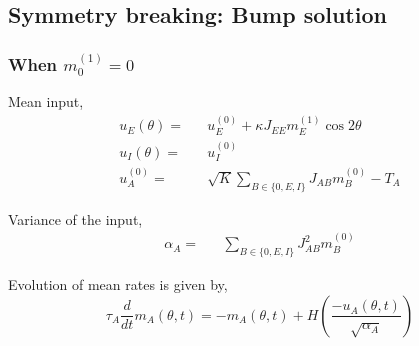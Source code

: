 \documentclass[%
 reprint,
 amsmath,amssymb,
 aps,
]{revtex4-1}
\begin{document}



\subsection{Symmetry breaking: Bump solution} 

\subsubsection{When  $m_0^{(1)} = 0$}

Mean input, \\
\begin{eqnarray}
u_E(\theta) =&& u^{(0)}_E + \kappa J_{EE} m_E^{(1)} \cos 2 \theta \\
u_I(\theta) =&& u^{(0)}_I \\
u^{(0)}_A =&& \sqrt{K} \sum_{B \in \lbrace 0, E, I\rbrace} J_{AB} m_B^{(0)}  - T_A\label{uaTeq} 
\end{eqnarray}

Variance of the input,\\
\begin{eqnarray}
\alpha_A =&& \sum_{B \in \lbrace 0, E, I\rbrace} J_{AB}^2 m_B^{(0)} \label{alphaE}
\end{eqnarray}

Evolution of mean rates is given by,\\
\begin{equation}
\tau_A \frac{d}{dt} m_A(\theta, t) = -m_A(\theta, t) + H\left( \frac{-u_A(\theta, t)}{\sqrt{\alpha_A}} \right)
\end{equation}
\\
\end{document}
